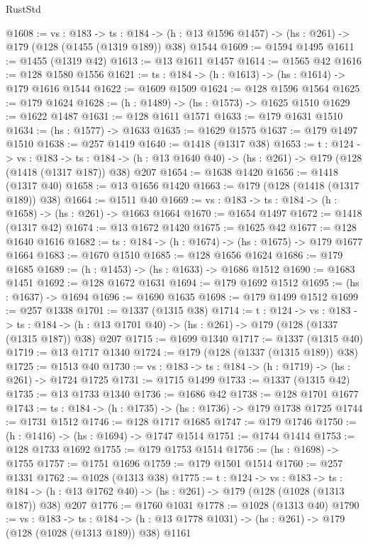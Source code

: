 \begin{lexlean}{RustStd}
\begin{coremodule}
@1608 := {vs : @183} ->
  {ts : @184} -> (h : @13 @1596 @1457) -> (hs : @261) -> @179 (@128 (@1455 (@1319 @189)) @38) @1544
@1609 := @1594 @1495
@1611 := @1455 (@1319 @42)
@1613 := @13 @1611 @1457
@1614 := @1565 @42
@1616 := @128 @1580 @1556
@1621 := {ts : @184} -> (h : @1613) -> (hs : @1614) -> @179 @1616 @1544
@1622 := @1609 @1509
@1624 := @128 @1596 @1564
@1625 := @179 @1624
@1628 := (h : @1489) -> (hs : @1573) -> @1625 @1510
@1629 := @1622 @1487
@1631 := @128 @1611 @1571
@1633 := @179 @1631 @1510
@1634 := (hs : @1577) -> @1633
@1635 := @1629 @1575
@1637 := @179 @1497 @1510
@1638 := @257 @1419
@1640 := @1418 (@1317 @38)
@1653 := {t : @124} ->
  {vs : @183} ->
  {ts : @184} -> (h : @13 @1640 @40) -> (hs : @261) -> @179 (@128 (@1418 (@1317 @187)) @38) @207
@1654 := @1638 @1420
@1656 := @1418 (@1317 @40)
@1658 := @13 @1656 @1420
@1663 := @179 (@128 (@1418 (@1317 @189)) @38)
@1664 := @1511 @40
@1669 := {vs : @183} -> {ts : @184} -> (h : @1658) -> (hs : @261) -> @1663 @1664
@1670 := @1654 @1497
@1672 := @1418 (@1317 @42)
@1674 := @13 @1672 @1420
@1675 := @1625 @42
@1677 := @128 @1640 @1616
@1682 := {ts : @184} -> (h : @1674) -> (hs : @1675) -> @179 @1677 @1664
@1683 := @1670 @1510
@1685 := @128 @1656 @1624
@1686 := @179 @1685
@1689 := (h : @1453) -> (hs : @1633) -> @1686 @1512
@1690 := @1683 @1451
@1692 := @128 @1672 @1631
@1694 := @179 @1692 @1512
@1695 := (hs : @1637) -> @1694
@1696 := @1690 @1635
@1698 := @179 @1499 @1512
@1699 := @257 @1338
@1701 := @1337 (@1315 @38)
@1714 := {t : @124} ->
  {vs : @183} ->
  {ts : @184} -> (h : @13 @1701 @40) -> (hs : @261) -> @179 (@128 (@1337 (@1315 @187)) @38) @207
@1715 := @1699 @1340
@1717 := @1337 (@1315 @40)
@1719 := @13 @1717 @1340
@1724 := @179 (@128 (@1337 (@1315 @189)) @38)
@1725 := @1513 @40
@1730 := {vs : @183} -> {ts : @184} -> (h : @1719) -> (hs : @261) -> @1724 @1725
@1731 := @1715 @1499
@1733 := @1337 (@1315 @42)
@1735 := @13 @1733 @1340
@1736 := @1686 @42
@1738 := @128 @1701 @1677
@1743 := {ts : @184} -> (h : @1735) -> (hs : @1736) -> @179 @1738 @1725
@1744 := @1731 @1512
@1746 := @128 @1717 @1685
@1747 := @179 @1746
@1750 := (h : @1416) -> (hs : @1694) -> @1747 @1514
@1751 := @1744 @1414
@1753 := @128 @1733 @1692
@1755 := @179 @1753 @1514
@1756 := (hs : @1698) -> @1755
@1757 := @1751 @1696
@1759 := @179 @1501 @1514
@1760 := @257 @1331
@1762 := @1028 (@1313 @38)
@1775 := {t : @124} ->
  {vs : @183} ->
  {ts : @184} -> (h : @13 @1762 @40) -> (hs : @261) -> @179 (@128 (@1028 (@1313 @187)) @38) @207
@1776 := @1760 @1031
@1778 := @1028 (@1313 @40)
@1790 := {vs : @183} ->
  {ts : @184} -> (h : @13 @1778 @1031) -> (hs : @261) -> @179 (@128 (@1028 (@1313 @189)) @38) @1161

\end{coremodule}
\end{lexlean}
